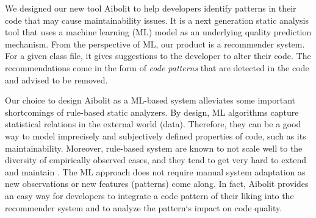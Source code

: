 We designed our new tool Aibolit to help developers identify patterns in their
code  that may cause maintainability issues. It is a next generation static
analysis tool that uses a machine learning (ML) model as an underlying quality
prediction mechanism. From the perspective of ML, our product is a recommender
system. For a given class file, it gives suggestions to the developer to alter
their code. The recommendations come in the form of \textit{code patterns} that
are detected in the code and advised to be removed.

Our choice to design Aibolit as a ML-based system alleviates some important
shortcomings of rule-based static analyzers. By design, ML algorithms capture
statistical relations in the external world (data). Therefore, they can be a
good way to model imprecisely and subjectively defined properties of code, such
as its maintainability. Moreover, rule-based system are known to not scale well
to the diversity of empirically observed cases, and they tend to get very hard
to extend and maintain \citep{LenatFeigenbaum1987}. The ML
approach does not require
manual system adaptation as new observations or new features (patterns) come
along. In fact, Aibolit provides an easy way for developers to integrate a code
pattern of their liking into the recommender system and to analyze the pattern`s
impact on code quality.






